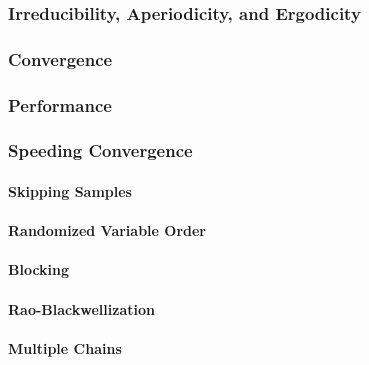             \subsubsection{Irreducibility, Aperiodicity, and Ergodicity} %

            \subsubsection{Convergence} %

            \subsubsection{Performance} %

            \subsubsection{Speeding Convergence} %

                \paragraph{Skipping Samples} %

                \paragraph{Randomized Variable Order} %

                \paragraph{Blocking} %

                \paragraph{Rao-Blackwellization} %

                \paragraph{Multiple Chains} %

